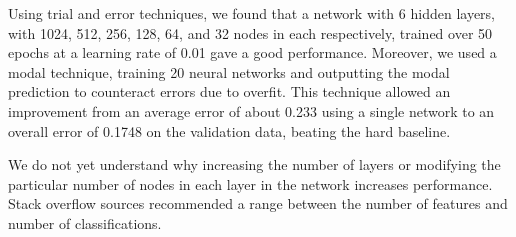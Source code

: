 \documentclass[a4paper, 11pt]{article}
\begin{document}
Using trial and error techniques, we found that a network with 6 hidden layers, with 1024, 512, 256, 128, 64, and 32 nodes in each respectively, trained over 50 epochs at a learning rate of 0.01 gave a good performance. Moreover, we used a modal technique, training 20 neural networks and outputting the modal prediction to counteract errors due to overfit. This technique allowed an improvement from an average error of about 0.233 using a single network to an overall error of 0.1748 on the validation data, beating the hard baseline.

We do not yet understand why increasing the number of layers or modifying the particular number of nodes in each layer in the network increases performance. Stack overflow sources recommended a range between the number of features and number of classifications.
\end{document}
